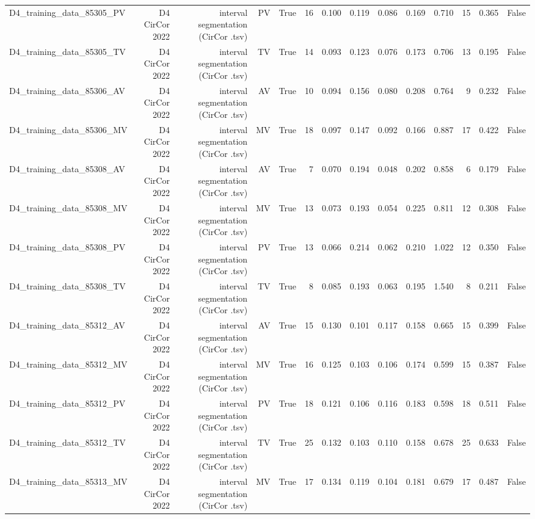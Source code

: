 \begin{table}[htbp]
\begin{tabular}{lrrrrrrrrrrrrr}
    D4\_training\_data\_85305\_PV & D4 CirCor 2022 & interval segmentation (CirCor .tsv) & PV & True & 16 & 0.100 & 0.119 & 0.086 & 0.169 & 0.710 & 15 & 0.365 & False \\
    D4\_training\_data\_85305\_TV & D4 CirCor 2022 & interval segmentation (CirCor .tsv) & TV & True & 14 & 0.093 & 0.123 & 0.076 & 0.173 & 0.706 & 13 & 0.195 & False \\
    D4\_training\_data\_85306\_AV & D4 CirCor 2022 & interval segmentation (CirCor .tsv) & AV & True & 10 & 0.094 & 0.156 & 0.080 & 0.208 & 0.764 & 9 & 0.232 & False \\
    D4\_training\_data\_85306\_MV & D4 CirCor 2022 & interval segmentation (CirCor .tsv) & MV & True & 18 & 0.097 & 0.147 & 0.092 & 0.166 & 0.887 & 17 & 0.422 & False \\
    D4\_training\_data\_85308\_AV & D4 CirCor 2022 & interval segmentation (CirCor .tsv) & AV & True & 7 & 0.070 & 0.194 & 0.048 & 0.202 & 0.858 & 6 & 0.179 & False \\
    D4\_training\_data\_85308\_MV & D4 CirCor 2022 & interval segmentation (CirCor .tsv) & MV & True & 13 & 0.073 & 0.193 & 0.054 & 0.225 & 0.811 & 12 & 0.308 & False \\
    D4\_training\_data\_85308\_PV & D4 CirCor 2022 & interval segmentation (CirCor .tsv) & PV & True & 13 & 0.066 & 0.214 & 0.062 & 0.210 & 1.022 & 12 & 0.350 & False \\
    D4\_training\_data\_85308\_TV & D4 CirCor 2022 & interval segmentation (CirCor .tsv) & TV & True & 8 & 0.085 & 0.193 & 0.063 & 0.195 & 1.540 & 8 & 0.211 & False \\
    D4\_training\_data\_85312\_AV & D4 CirCor 2022 & interval segmentation (CirCor .tsv) & AV & True & 15 & 0.130 & 0.101 & 0.117 & 0.158 & 0.665 & 15 & 0.399 & False \\
    D4\_training\_data\_85312\_MV & D4 CirCor 2022 & interval segmentation (CirCor .tsv) & MV & True & 16 & 0.125 & 0.103 & 0.106 & 0.174 & 0.599 & 15 & 0.387 & False \\
    D4\_training\_data\_85312\_PV & D4 CirCor 2022 & interval segmentation (CirCor .tsv) & PV & True & 18 & 0.121 & 0.106 & 0.116 & 0.183 & 0.598 & 18 & 0.511 & False \\
    D4\_training\_data\_85312\_TV & D4 CirCor 2022 & interval segmentation (CirCor .tsv) & TV & True & 25 & 0.132 & 0.103 & 0.110 & 0.158 & 0.678 & 25 & 0.633 & False \\
    D4\_training\_data\_85313\_MV & D4 CirCor 2022 & interval segmentation (CirCor .tsv) & MV & True & 17 & 0.134 & 0.119 & 0.104 & 0.181 & 0.679 & 17 & 0.487 & False \\

\end{tabular}
\end{table}
